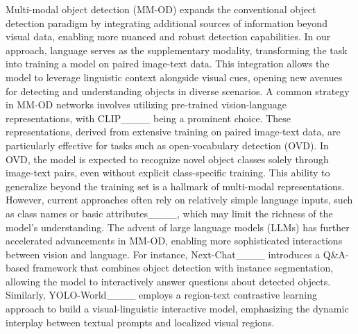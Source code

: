 Multi-modal object detection (MM-OD) expands the conventional object detection paradigm by integrating additional sources of information beyond visual data, enabling more nuanced and robust detection capabilities. In our approach, language serves as the supplementary modality, transforming the task into training a model on paired image-text data. This integration allows the model to leverage linguistic context alongside visual cues, opening new avenues for detecting and understanding objects in diverse scenarios.
A common strategy in MM-OD networks involves utilizing pre-trained vision-language representations, with CLIP____ being a prominent choice. These representations, derived from extensive training on paired image-text data, are particularly effective for tasks such as open-vocabulary detection (OVD). In OVD, the model is expected to recognize novel object classes solely through image-text pairs, even without explicit class-specific training. This ability to generalize beyond the training set is a hallmark of multi-modal representations. However, current approaches often rely on relatively simple language inputs, such as class names or basic attributes____, which may limit the richness of the model's understanding.
The advent of large language models (LLMs) has further accelerated advancements in MM-OD, enabling more sophisticated interactions between vision and language. For instance, Next-Chat____ introduces a Q\&A-based framework that combines object detection with instance segmentation, allowing the model to interactively answer questions about detected objects. Similarly, YOLO-World____ employs a region-text contrastive learning approach to build a visual-linguistic interactive model, emphasizing the dynamic interplay between textual prompts and localized visual regions.

 

